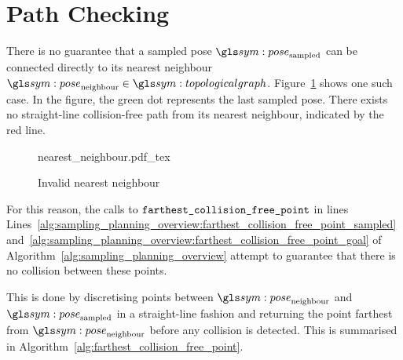 \section{Path Checking}%
\label{sec:path_checking}

	\begin{sloppypar}

		There is no guarantee that a sampled pose $\pose_\text{sampled}$ can
		be connected directly to its nearest neighbour
		$\pose_\text{neighbour} \in \topologicalgraph$.
		Figure~\ref{fig:nearest_neighbour} shows one such case. In the figure,
		the green dot represents the last sampled pose. There exists no
		straight-line collision-free path from its nearest neighbour, indicated
		by the red line.

		\begin{figure}[hb]
			\centering
			\def\svgwidth{0.75\columnwidth}
			{nearest_neighbour.pdf_tex}
			\caption{Invalid nearest neighbour}%
			\label{fig:nearest_neighbour}
		\end{figure}

		For this reason, the calls to
		$\texttt{farthest\_collision\_free\_point}$ in lines
		Lines~\ref{alg:sampling_planning_overview:farthest_collision_free_point_sampled}
		and~\ref{alg:sampling_planning_overview:farthest_collision_free_point_goal}
		of Algorithm~\ref{alg:sampling_planning_overview} attempt to
		guarantee that there is no collision between these points.

	\end{sloppypar}

	This is done by discretising points between $\pose_\text{neighbour}$ and
	$\pose_\text{sampled}$ in a straight-line fashion and returning the
	point farthest from $\pose_\text{neighbour}$ before any collision is
	detected. This is summarised in
	Algorithm~\ref{alg:farthest_collision_free_point}.

